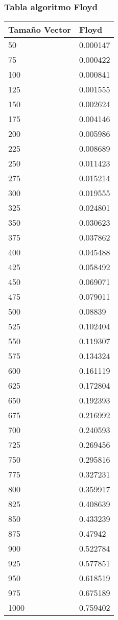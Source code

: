 \documentclass[a4paper, 11pt]{article}
\begin{document}
\subsubsection{Tabla algoritmo Floyd}
\begin{tabular}{@{}ll@{}}
\toprule
Tamaño Vector & Floyd    \\ \midrule
50            & 0.000147 \\
75            & 0.000422 \\
100           & 0.000841 \\
125           & 0.001555 \\
150           & 0.002624 \\
175           & 0.004146 \\
200           & 0.005986 \\
225           & 0.008689 \\
250           & 0.011423 \\ 
275           & 0.015214 \\
300           & 0.019555 \\
325           & 0.024801 \\
350           & 0.030623 \\
375           & 0.037862 \\
400           & 0.045488 \\
425           & 0.058492 \\
450           & 0.069071 \\
475           & 0.079011 \\
500           & 0.08839  \\
525           & 0.102404 \\
550           & 0.119307 \\
575           & 0.134324 \\
600           & 0.161119 \\
625           & 0.172804 \\
650           & 0.192393 \\
675           & 0.216992 \\
700           & 0.240593 \\
725           & 0.269456 \\
750           & 0.295816 \\
775           & 0.327231 \\
800           & 0.359917 \\
825           & 0.408639 \\
850           & 0.433239 \\
875           & 0.47942  \\
900           & 0.522784 \\
925           & 0.577851 \\
950           & 0.618519 \\
975           & 0.675189 \\
1000          & 0.759402 \\ \bottomrule
\end{tabular}


\end{document}
